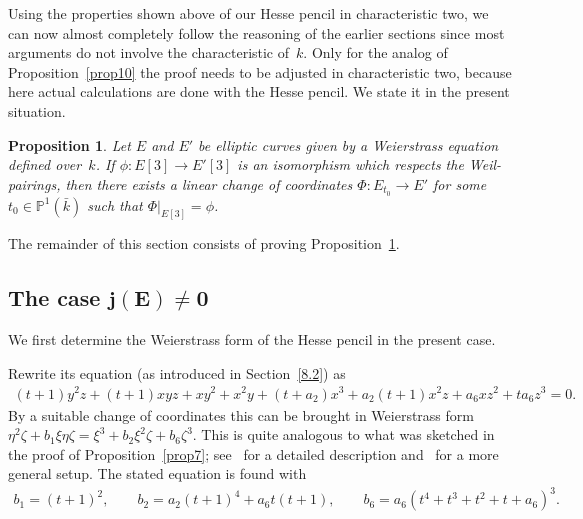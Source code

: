 \documentclass[pdftex]{sigma}
\numberwithin{equation}{section}
\newtheorem{Proposition}[Theorem]{Proposition}
\begin{document}
Using the properties shown above of our Hesse pencil in characteristic two, we can now almost completely follow the reasoning of the earlier sections since most arguments do not involve the characteristic of~$k$. Only for the analog of Proposition~\ref{prop10} the proof needs to be adjusted in characteristic two, because here actual calculations are done with the Hesse pencil. We state it in the present situation.

\begin{Proposition}\label{4.10}Let $E$ and $E'$ be elliptic curves given by a Weierstrass equation defined over~$k$. If $\phi \colon E[3] \rightarrow E'[3]$ is an isomorphism which respects the Weil-pairings, then there exists a linear change of coordinates $\Phi\colon E_{t_0} \rightarrow E'$ for some $t_0 \in \mathbb{P}^1(\bar{k})$ such that $\Phi|_{E[3]} = \phi$.
\end{Proposition}

The remainder of this section consists of proving Proposition~\ref{4.10}.

\subsection[The case $j(E) \neq 0$]{The case $\boldsymbol{j(E) \neq 0}$}

We first determine the Weierstrass form of the Hesse pencil in the present case.

Rewrite its equation (as introduced in Section~\ref{8.2}) as
\begin{gather*} (t+1)y^2z+(t+1)xyz+xy^2+x^2y +(t+a_2)x^3+a_2(t+1)x^2z+a_6xz^2+ta_6z^3 =0.\end{gather*}
By a suitable change of coordinates this can be brought in Weierstrass form $\eta^2\zeta + b_1\xi \eta \zeta = \xi^3 + b_2 \xi^2 \zeta + b_6 \zeta^3$. This is quite analogous to what was sketched in the proof of Proposition~\ref{prop7}; see~\cite{tuijp2015} for a detailed description and~\cite{ART} for a more general setup. The stated equation is found with
\begin{gather*}
b_1 = (t+1)^2,\qquad
b_2 = a_2(t+1)^4+a_6t(t+1),\qquad
b_6 = {a_6}(t^4+t^3+t^2+t+a_6)^3.
\end{gather*}
\end{document}
